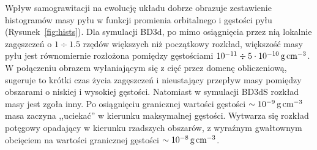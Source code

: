 %
\par Wpływ samograwitacji na ewolucję układu dobrze obrazuje zestawienie
histogramów masy pyłu w funkcji promienia orbitalnego i gęstości pyłu
(Rysunek~\ref{fig:hists}). Dla symulacji BD3d, po mimo osiągnięcia przez nią
lokalnie zagęszczeń o $1\div1.5$ rzędów większych niż początkowy rozkład,
większość masy pyłu jest równomiernie rozłożona pomiędzy gęstościami $10^{-11}
\div 5\cdot10^{-10}\hbox{$\thinspace\textrm{g}$}\hbox{$\thinspace\textrm{cm}$}^{-3}$. W połączeniu obrazem wyłaniającym się z cięć
przez domenę obliczeniową, sugeruje to krótki czas życia zagęszczeń i
nieustający przepływ masy pomiędzy obszarami o niskiej i wysokiej gęstości.
Natomiast w symulacji BD3dS rozkład masy jest zgoła inny. Po osiągnięciu
granicznej wartości gęstości $\sim10^{-9}\hbox{$\thinspace\textrm{g}$}\hbox{$\thinspace\textrm{cm}$}^{-3}$ masa zaczyna ,,uciekać'' w
kierunku maksymalnej gęstości. Wytwarza się rozkład potęgowy opadający w
kierunku rzadszych obszarów, z wyraźnym gwałtownym obcięciem na wartości
granicznej gęstości $\sim10^{-8}\hbox{$\thinspace\textrm{g}$}\hbox{$\thinspace\textrm{cm}$}^{-3}$.
%
